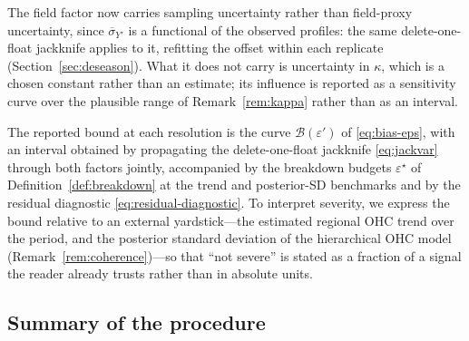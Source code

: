 The field factor now carries sampling uncertainty rather than
field-proxy uncertainty, since $\overline{\sigma}_{Y'}$ is a functional
of the observed profiles: the same delete-one-float jackknife applies to
it, refitting the offset within each replicate
(Section~\ref{sec:deseason}). What it does not carry is uncertainty in
$\kappa$, which is a chosen constant rather than an estimate; its
influence is reported as a sensitivity curve over the plausible range of
Remark~\ref{rem:kappa} rather than as an interval.

The reported bound at each resolution is the curve
$\mathcal{B}(\varepsilon')$ of \eqref{eq:bias-eps}, with an interval
obtained by propagating the delete-one-float jackknife
\eqref{eq:jackvar} through both factors jointly, accompanied by the
breakdown budgets $\varepsilon^{\star}$ of
Definition~\ref{def:breakdown} at the trend and posterior-SD benchmarks
and by the residual diagnostic \eqref{eq:residual-diagnostic}. To interpret
severity, we express the bound relative to an external yardstick---the
estimated regional OHC trend over the period, and the posterior
standard deviation of the hierarchical OHC model
(Remark~\ref{rem:coherence})---so that ``not severe'' is stated as a
fraction of a signal the reader already trusts rather than in absolute
units.

\subsection{Summary of the procedure}
\label{sec:procedure}

